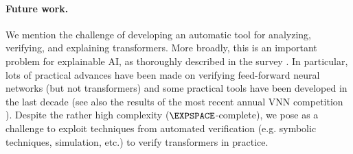 \paragraph{Future work.} 
We mention the challenge of developing an automatic tool for analyzing, 
verifying, and explaining transformers. More broadly, this is an important 
problem for explainable AI, as thoroughly described in the survey 
\citep{survey-explainable}. In particular, lots of practical advances have been 
made on verifying feed-forward neural networks (but not transformers) and some 
practical tools have 
been developed in the last decade (see also the results of the most recent 
annual VNN competition \citep{vnn-result24}). Despite the rather high complexity
($\EXPSPACE$-complete), we pose as a challenge to exploit techniques from 
automated verification \citep{model-checking-book} (e.g. symbolic techniques, 
simulation, etc.) to verify transformers in practice.
